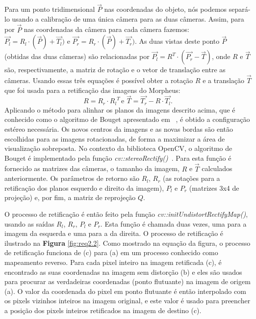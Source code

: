 \documentclass{bmvc2k}
\begin{document}
Para um ponto tridimensional $\overrightarrow{P}$ nas coordenadas do objeto, nós podemos separá-lo usando a calibração de uma única câmera para as duas câmeras. Assim, para por $\overrightarrow{P}$ nas coordenadas da câmera para cada câmera fazemos: $\overrightarrow{P_l} = {R_l} \cdot (\overrightarrow{P}) + \overrightarrow{T_l})$ e $\overrightarrow{P_r} = {R_r} \cdot (\overrightarrow{P}) + \overrightarrow{T_r})$.
As duas vistas deste ponto $\overrightarrow{P}$ (obtidas das duas câmeras) são relacionadas por $\overrightarrow{P_l} = {R^T} \cdot (\overrightarrow{P_r} - \overrightarrow{T} )$, onde $R$ e $\overrightarrow{T}$ são, respectivamente, a matriz de rotação e o vetor de translação entre as câmeras. Usando essas três equações é possível obter a rotação $R$ e a translação $\overrightarrow{T}$ que foi usada para a retificação das imagens do Morpheus: $$R = R_r \cdot {R_l}^T \, \mbox{e } \overrightarrow{T} = \overrightarrow{T_r} - R \cdot \overrightarrow{T_l}.$$
Aplicando o método para alinhar os planos da imagens descrito acima, que é conhecido como o algoritmo de Bouget apresentado em ~\cite{kaehler2016learning}, é obtido a configuração estéreo necessária. Os novos centros da imagens e as novas bordas são então escolhidas para as imagens rotacionadas, de forma a maximizar a área de visualização sobreposta. No contexto da biblioteca OpenCV, o algoritmo de Bouget é implementado pela função \textit{cv::stereoRectify()}~\cite{opencvmanual}. Para esta função é fornecido as matrizes das câmeras, o tamanho da imagem, $R$ e $\overrightarrow{T}$ calculados anteriormente. Os parâmetros de retorno são $R_l$, $R_r$ (as rotações para a retificação dos planos esquerdo e direito da imagem), $P_l$ e $P_r$ (matrizes 3x4 de projeção) e, por fim, a matriz de reprojeção $Q$.

O processo de retificação é então feito pela função \textit{cv::initUndistortRectifyMap()}, usando as saídas $R_l$, $R_r$, $P_l$ e $P_r$. Esta função é chamada duas vezes, uma para a imagem da esquerda e uma para a da direita. O processo de retificação é ilustrado na \textbf{Figura} \ref{fig:req2.2}. Como mostrado na equação da figura, o processo de retificação funciona de (c) para (a) em um processo conhecido como mapeamento reverso. Para cada pixel inteiro na imagem retificada (c), é encontrado as suas coordenadas na imagem sem distorção (b) e eles são usados para procurar as verdadeiras coordenadas (ponto flutuante) na imagem de origem (a). O valor da coordenada do pixel em ponto flutuante é então interpolado com os pixels vizinhos inteiros na imagem original, e este valor é usado para preencher a posição dos pixels inteiros retificados na imagem de destino (c).
\end{document}
